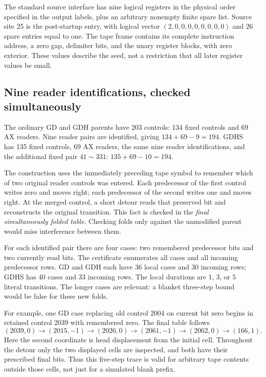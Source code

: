 \documentclass[11pt,letterpaper]{article}
\theoremstyle{definition}
\begin{document}
The standard source interface has nine logical registers in the physical
order specified in the output labels, plus an arbitrary nonempty finite
spare list. Source site 25 is the post-startup entry, with logical vector
$(2,0,0,0,0,0,0,0,0)$ and 26 spare entries equal to one. The tape frame
contains its complete instruction address, a zero gap, delimiter bits,
and the unary register blocks, with zero exterior. These values describe
the seed, not a restriction that all later register values be small.

\subsection{Nine reader identifications, checked simultaneously}
The ordinary GD and GDH parents have 203 controls:
134 fixed controls and 69 AX readers. Nine reader pairs are identified,
giving $134+69-9=194$. GDHS has 135 fixed controls, 69 AX readers, the same
nine reader identifications, and the additional fixed pair $41\sim331$:
$135+69-10=194$.



The construction uses the immediately preceding tape symbol to remember
which of two original reader controls was entered. Each predecessor of the
first control writes zero and moves right; each predecessor of the second
writes one and moves right. At the merged control, a short detour reads
that preserved bit and reconstructs the original transition. This fact is
checked in the \emph{final simultaneously folded table}. Checking folds
only against the unmodified parent would miss interference between them.

For each identified pair there are four cases: two remembered predecessor
bits and two currently read bits. The certificate enumerates all cases and
all incoming predecessor rows. GD and GDH each have 36 local cases and 30
incoming rows; GDHS has 40 cases and 33 incoming rows. The local durations
are 1, 3, or 5 literal transitions. The longer cases are relevant: a blanket
three-step bound would be false for these new folds.

For example, one GD case replacing old control 2004 on current bit zero
begins in retained control 2039 with remembered zero. The final table
follows
\[
 (2039,0)\to(2015,-1)\to(2026,0)\to(2061,-1)
 \to(2062,0)\to(166,1).
\]
Here the second coordinate is head displacement from the initial cell.
Throughout the detour only the two displayed cells are inspected, and
both have their prescribed final bits. Thus this five-step trace is valid
for arbitrary tape contents outside those cells, not just for a simulated
blank prefix.
\end{document}
